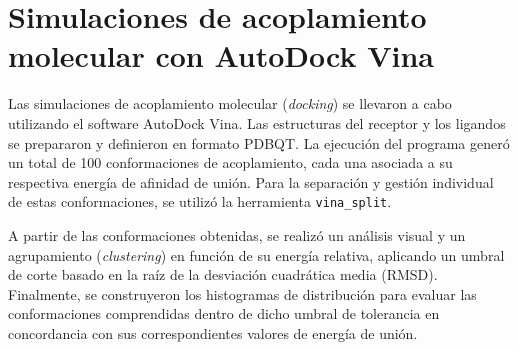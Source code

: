 \section{Simulaciones de acoplamiento molecular con AutoDock Vina}
Las simulaciones de acoplamiento molecular (\textit{docking}) se llevaron a cabo utilizando el software AutoDock Vina. Las estructuras del receptor y los ligandos se prepararon y definieron en formato PDBQT. La ejecución del programa generó un total de 100 conformaciones de acoplamiento, cada una asociada a su respectiva energía de afinidad de unión. Para la separación y gestión individual de estas conformaciones, se utilizó la herramienta \texttt{vina\_split}.

A partir de las conformaciones obtenidas, se realizó un análisis visual y un agrupamiento (\textit{clustering}) en función de su energía relativa, aplicando un umbral de corte basado en la raíz de la desviación cuadrática media (RMSD). Finalmente, se construyeron los histogramas de distribución para evaluar las conformaciones comprendidas dentro de dicho umbral de tolerancia en concordancia con sus correspondientes valores de energía de unión.


